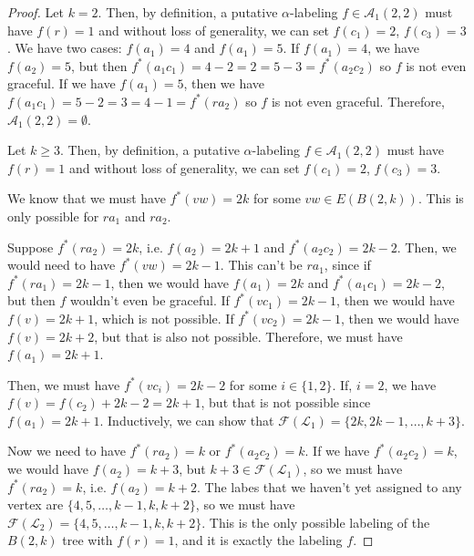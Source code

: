 \documentclass[10pt]{article}
\theoremstyle{definition}
\begin{document}
\begin{proof}
  Let $k = 2$. Then, by definition, a putative $\alpha$-labeling $f \in \mathcal{A}_1(2,2)$ must have $f(r) = 1$ and without loss of generality, we can set $f(c_1) = 2$, $f(c_3) = 3$. We have two cases: $f(a_1) = 4$ and $f(a_1) = 5$. If $f(a_1) = 4$, we have $f(a_2) = 5$, but then $f^*(a_1 c_1) = 4 - 2 = 2 = 5 - 3 = f^*(a_2 c_2)$ so $f$ is not even graceful. If we have $f(a_1) = 5$, then we have $f(a_1 c_1) = 5 - 2 = 3 = 4 - 1 = f^*(r a_2)$ so $f$ is not even graceful. Therefore, $\mathcal{A}_1(2, 2) = \emptyset$.

  Let $k \ge 3$. Then, by definition, a putative $\alpha$-labeling $f \in \mathcal{A}_1(2,2)$ must have $f(r) = 1$ and without loss of generality, we can set $f(c_1) = 2$, $f(c_3) = 3$.

  We know that we must have $f^*(vw) = 2k$ for some $vw \in E(B(2,k))$. This is only possible for $r a_1$ and $r a_2$.

  Suppose $f^*(r a_2) = 2k$, i.e. $f(a_2) = 2 k + 1$ and $f^*(a_2 c_2) = 2k - 2$. Then, we would need to have $f^*(vw) = 2k - 1$. This can't be $r a_1$, since if $f^*(r a_1) = 2k - 1$, then we would have $f(a_1) = 2k$ and $f^*(a_1 c_1) = 2k - 2$, but then $f$ wouldn't even be graceful. If $f^*(v c_1) = 2k -1$, then we would have $f(v) = 2k + 1$, which is not possible. If $f^*(v c_2) = 2k - 1$, then we would have $f(v) = 2k + 2$, but that is also not possible. Therefore, we must have $f(a_1) = 2k + 1$.

  Then, we must have $f^*(v c_i) = 2k - 2$ for some $i \in \{1,2\}$. If, $i = 2$, we have $f(v) = f(c_2) + 2k - 2 = 2k + 1$, but that is not possible since $f(a_1) = 2k + 1$. Inductively, we can show that $\mathcal{F}(\mathcal{L}_1) = \{2k, 2k - 1, \dots, k + 3\}$.

  Now we need to have $f^*(r a_2) = k$ or $f^*(a_2 c_2) = k$. If we have $f^*(a_2 c_2) = k$, we would have $f(a_2) = k + 3$, but $k + 3 \in \mathcal{F}(\mathcal{L}_1)$, so we must have $f^*(r a_2) = k$, i.e. $f(a_2) = k + 2$. The labes that we haven't yet assigned to any vertex are $\{4, 5, \dots, k-1, k, k+2\}$, so we must have $\mathcal{F}(\mathcal{L}_2) = \{4, 5, \dots, k-1, k, k+2\}$. This is the only possible labeling of the $B(2,k)$ tree with $f(r) = 1$, and it is exactly the labeling $f$.
\end{proof}
\end{document}
